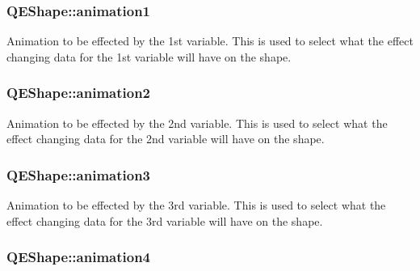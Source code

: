\hypertarget{classQEShape_a556ffe6debb4720b66dcb986c2de1e5b}{
\subsubsection[{animation1}]{ QEShape::animation1}}
\label{classQEShape_a556ffe6debb4720b66dcb986c2de1e5b}
Animation to be effected by the 1st variable. This is used to select what the effect changing data for the 1st variable will have on the shape. \hypertarget{classQEShape_ad84fcc7c38dc7f55a9e715f1948bc05f}{
\subsubsection[{animation2}]{ QEShape::animation2}}
\label{classQEShape_ad84fcc7c38dc7f55a9e715f1948bc05f}
Animation to be effected by the 2nd variable. This is used to select what the effect changing data for the 2nd variable will have on the shape. \hypertarget{classQEShape_a4378602e88fb8fff31b4e6f195219955}{
\subsubsection[{animation3}]{ QEShape::animation3}}
\label{classQEShape_a4378602e88fb8fff31b4e6f195219955}
Animation to be effected by the 3rd variable. This is used to select what the effect changing data for the 3rd variable will have on the shape. \hypertarget{classQEShape_a3f7804fddb5349f7a53f9deeeb400ef3}{
\subsubsection[{animation4}]{ QEShape::animation4}}
